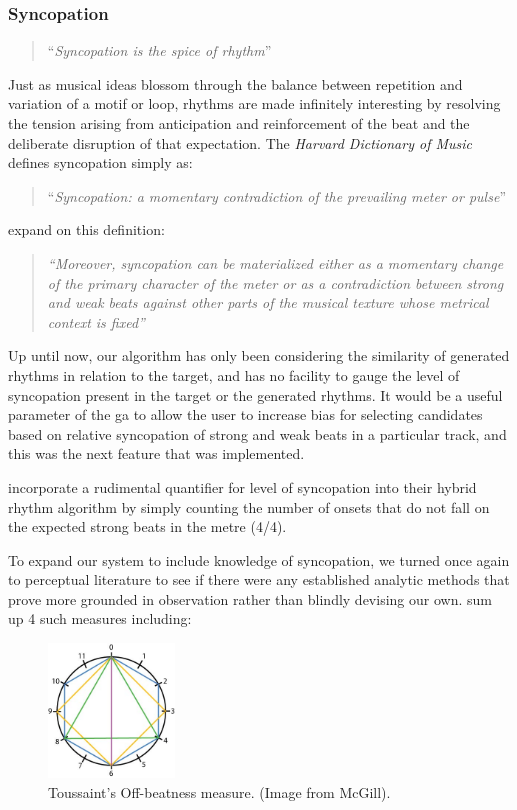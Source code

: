 {{{\subsubsection{Syncopation}

\blockcquote[]{Toussaint2013}{``\textit{Syncopation is the spice of rhythm}''}

Just as musical ideas blossom through the balance between repetition and variation of a motif or loop, rhythms are made infinitely interesting by resolving the tension arising from anticipation and reinforcement of the beat and the deliberate disruption of that expectation. The \textit{Harvard Dictionary of Music} defines syncopation simply as:

\blockcquote[]{Apel1969}{``\textit{Syncopation: a momentary contradiction of the prevailing meter or pulse}''}

\cite{Gomez2005} expand on this definition:

\blockquote{\textit{``Moreover, syncopation can be materialized either as a momentary change of the primary character of the meter or as a contradiction between strong and weak beats against other parts of the musical texture whose metrical context is fixed''}}

Up until now, our algorithm has only been considering the similarity of generated rhythms in relation to the target, and has no facility to gauge the level of syncopation present in the target or the generated rhythms. It would be a useful parameter of the \acrshort{ga} to allow the user to increase bias for selecting candidates based on relative syncopation of strong and weak beats in a particular track, and this was the next feature that was implemented.

\cite{Eigenfeldt2013} incorporate a rudimental quantifier for level of syncopation into their hybrid rhythm algorithm by simply counting the number of onsets that do not fall on the expected strong beats in the metre (4/4).

To expand our system to include knowledge of syncopation, we turned once again to perceptual literature to see if there were any established analytic methods that prove more grounded in observation rather than blindly devising our own. \cite{Gomez2005} sum up 4 such measures including:

  \begin{figure}
	\begin{center}
		\includegraphics[width=0.3\textwidth]{ch03_symbolic/figures/offBeatness.jpg}
	\end{center}
	\caption[Toussaint's Off-Beatness Measure]{Toussaint's Off-beatness measure. (Image from McGill).}
	\label{fig:offbeatness}
	\end{figure}
	
}}}
